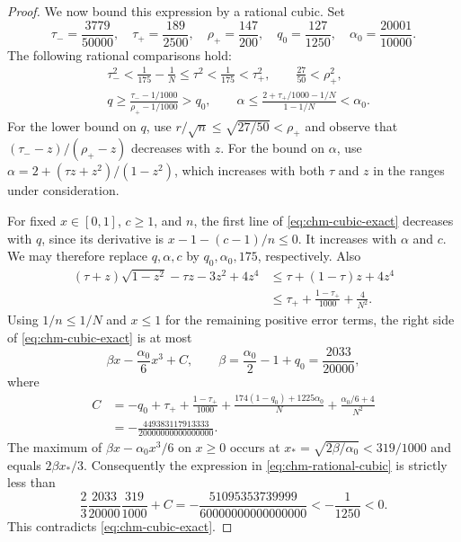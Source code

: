 \documentclass[11pt,a4paper]{article}
\theoremstyle{remark}\newtheorem{remark}[theorem]{Remark}
\begin{document}
\begin{proof}
We now bound this expression by a rational cubic. Set
\[
 \tau_- =\frac{3779}{50000},\quad
 \tau_+ =\frac{189}{2500},\quad
 \rho_+ =\frac{147}{200},\quad
 q_0=\frac{127}{1250},\quad
 \alpha_0=\frac{20001}{10000}.
\]
The following rational comparisons hold:
\begin{align}
 &\tau_-^2<\frac1{175}-\frac1N
                \le\tau^2<\frac1{175}<\tau_+^2,
                \qquad\frac{27}{50}<\rho_+^2,
                \label{eq:chm-tau-bounds}\\
 &q\ge\frac{\tau_- -1/1000}{\rho_+ -1/1000}>q_0,
                \qquad
 \alpha\le
 \frac{2+\tau_+/1000-1/N}{1-1/N}<\alpha_0.
                \label{eq:chm-q-alpha-bounds}
\end{align}
For the lower bound on $q$, use $r/\sqrt n\le\sqrt{27/50}<\rho_+$
and observe that $(\tau_- -z)/(\rho_+ -z)$ decreases with $z$.
For the bound on $\alpha$, use
$\alpha=2+(\tau z+z^2)/(1-z^2)$, which increases with both
$\tau$ and $z$ in the ranges under consideration.

For fixed $x\in[0,1]$, $c\ge1$, and $n$, the first line of
\eqref{eq:chm-cubic-exact} decreases with $q$, since its derivative
is $x-1-(c-1)/n\le0$. It increases with $\alpha$ and $c$.
We may therefore replace $q,\alpha,c$ by $q_0,\alpha_0,175$,
respectively. Also
\begin{align*}
 (\tau+z)\sqrt{1-z^2}-\tau z-3z^2+4z^4
 &\le\tau+(1-\tau)z+4z^4\\
 &\le\tau_++\frac{1-\tau_+}{1000}+\frac4{N^2}.
\end{align*}
Using $1/n\le1/N$ and $x\le1$ for the remaining positive error
terms, the right side of \eqref{eq:chm-cubic-exact} is at most
\begin{equation}\label{eq:chm-rational-cubic}
 \beta x-\frac{\alpha_0}{6}x^3+C,
 \qquad \beta=\frac{\alpha_0}{2}-1+q_0=\frac{2033}{20000},
\end{equation}
where
\begin{align}
 C&=-q_0+\tau_++\frac{1-\tau_+}{1000}
       +\frac{174(1-q_0)+1225\alpha_0}{N}
       +\frac{\alpha_0/6+4}{N^2}\nonumber\\
  &=-\frac{449383117913333}{20000000000000000}.
       \label{eq:chm-cubic-constant}
\end{align}
The maximum of $\beta x-\alpha_0x^3/6$ on $x\ge0$ occurs at
$x_* =\sqrt{2\beta/\alpha_0}<319/1000$ and equals
$2\beta x_*/3$. Consequently the expression in
\eqref{eq:chm-rational-cubic} is strictly less than
\begin{equation}\label{eq:chm-negative-certificate}
 \frac23\frac{2033}{20000}\frac{319}{1000}+C
  =-\frac{51095353739999}{60000000000000000}
  <-\frac1{1250}<0.
\end{equation}
This contradicts \eqref{eq:chm-cubic-exact}.


\end{proof}
\end{document}

